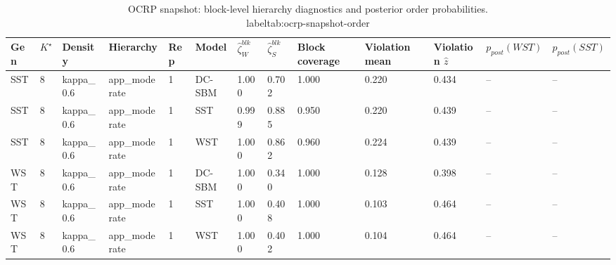 \begin{table}[!h]
\centering
\caption{OCRP snapshot: block-level hierarchy diagnostics and posterior order probabilities.\\label{tab:ocrp-snapshot-order}}
\centering
\begin{tabular}[t]{lllllllllllll}
\toprule
Gen & $K^\star$ & Density & Hierarchy & Rep & Model & $\widehat\zeta_W^{blk}$ & $\widehat\zeta_S^{blk}$ & Block coverage & Violation mean & Violation $\hat z$ & $p_{post}(WST)$ & $p_{post}(SST)$\\
\midrule
SST & 8 & kappa_0.6 & app_moderate & 1 & DC-SBM & 1.000 & 0.702 & 1.000 & 0.220 & 0.434 & -- & --\\
SST & 8 & kappa_0.6 & app_moderate & 1 & SST & 0.999 & 0.885 & 0.950 & 0.220 & 0.439 & -- & --\\
SST & 8 & kappa_0.6 & app_moderate & 1 & WST & 1.000 & 0.862 & 0.960 & 0.224 & 0.439 & -- & --\\
WST & 8 & kappa_0.6 & app_moderate & 1 & DC-SBM & 1.000 & 0.340 & 1.000 & 0.128 & 0.398 & -- & --\\
WST & 8 & kappa_0.6 & app_moderate & 1 & SST & 1.000 & 0.408 & 1.000 & 0.103 & 0.464 & -- & --\\
WST & 8 & kappa_0.6 & app_moderate & 1 & WST & 1.000 & 0.402 & 1.000 & 0.104 & 0.464 & -- & --\\
\bottomrule
\end{tabular}
\end{table}
